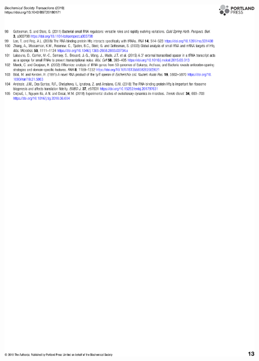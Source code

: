 \begin{figure}
    \centering
    \includegraphics[width=\linewidth]{lit_review/page13.png}
\end{figure}